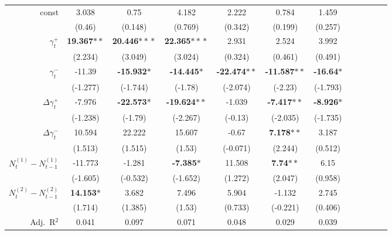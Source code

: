 \documentclass[11pt,a4paper]{article}
\numberwithin{equation}{section}
\theoremstyle{remark}
\theoremstyle{definition}
\begin{document}
\begin{table}[!tp]
\begin{center}
\begin{tabular}{rSSSSSSSSSSS}
\toprule	& 	& 	& 	& 	& 	& 	\\\midrule
const	& 3.038	& 0.75	& 4.182	& 2.222	& 0.784	& 1.459	\\
	& (0.46)	& (0.148)	& (0.769)	& (0.342)	& (0.199)	& (0.257)	\\
$\gamma^+_t$	& {\bf 19.367$**$}	& {\bf 20.446$*\!*\!*$}	& {\bf 22.365$*\!*\!*$}	& 2.931	& 2.524	& 3.992	\\
	& (2.234)	& (3.049)	& (3.024)	& (0.324)	& (0.461)	& (0.491)	\\
$\gamma^-_t$	& -11.39	& {\bf -15.932$*$}	& {\bf -14.445$*$}	& {\bf -22.474$**$}	& {\bf -11.587$**$}	& {\bf -16.64$*$}	\\
	& (-1.277)	& (-1.744)	& (-1.78)	& (-2.074)	& (-2.23)	& (-1.793)	\\
$\Delta\gamma^+_t$	& -7.976	& {\bf -22.573$*$}	& {\bf -19.624$**$}	& -1.039	& {\bf -7.417$**$}	& {\bf -8.926$*$}	\\
	& (-1.238)	& (-1.79)	& (-2.267)	& (-0.13)	& (-2.035)	& (-1.735)	\\
$\Delta\gamma^-_t$	& 10.594	& 22.222	& 15.607	& -0.67	& {\bf 7.178$**$}	& 3.187	\\
	& (1.513)	& (1.515)	& (1.53)	& (-0.071)	& (2.244)	& (0.512)	\\
$N^{(1)}_t - N^{(1)}_{t-1}$	& -11.773	& -1.281	& {\bf -7.385$*$}	& 11.508	& {\bf 7.74$**$}	& 6.15	\\
	& (-1.605)	& (-0.532)	& (-1.652)	& (1.272)	& (2.047)	& (0.958)	\\
$N^{(2)}_t - N^{(2)}_{t-1}$	& {\bf 14.153$*$}	& 3.682	& 7.496	& 5.904	& -1.132	& 2.745	\\
	& (1.714)	& (1.385)	& (1.53)	& (0.733)	& (-0.221)	& (0.406)	\\\midrule
Adj.\ R$^2$	& 0.041	& 0.097	& 0.071	& 0.048	& 0.029	& 0.039	\\\bottomrule
\end{tabular}
    \end{center}
    \label{tab:short_option_regressions}
\end{table}
\end{document}
